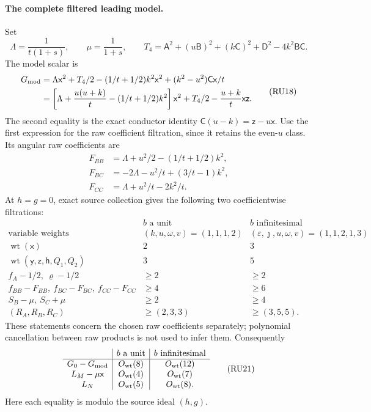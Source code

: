 \paragraph{The complete filtered leading model.}
Set
\[
 \Lambda=\frac1{t(1+s)},\qquad \mu=\frac1{1+s},\qquad
 T_4=\mathsf A^2+(u\mathsf B)^2+(k\mathsf C)^2+
                \mathsf D^2-4k^2\mathsf B\mathsf C.
\]
The model scalar is
\[
\begin{aligned}
 G_{\rm mod}
 &=\Lambda\mathsf x^2+T_4/2-(1/t+1/2)k^2\mathsf x^2
                      +(k^2-u^2)\mathsf C\mathsf x/t\\
 &=\left[\Lambda+\frac{u(u+k)}t-(1/t+1/2)k^2\right]\mathsf x^2
                  +T_4/2-\frac{u+k}t\mathsf x\mathsf z.
\end{aligned}                                                     \tag{RU18}
\]
The second equality is the exact conductor identity
$\mathsf C(u-k)=\mathsf z-u\mathsf x$. Use the first expression
for the raw coefficient filtration, since it retains the even-$u$
class. Its angular raw coefficients are
\[
\begin{aligned}
 F_{BB}&=\Lambda+u^2/2-(1/t+1/2)k^2,\\
 F_{BC}&=-2\Lambda-u^2/t+(3/t-1)k^2,\\
 F_{CC}&=\Lambda+u^2/t-2k^2/t.
\end{aligned}                                                     \tag{RU19}
\]
At $h=g=0$, exact source collection gives the following two
coefficientwise filtrations:
\[
\begin{array}{c|c|c}
 &b\text{ a unit}&b\text{ infinitesimal}\\ \hline
 \text{variable weights}&(k,u,\omega,v)=(1,1,1,2)
     &(\varepsilon,\jmath,u,\omega,v)=(1,1,2,1,3)\\
 \operatorname{wt}(\mathsf x)&2&3\\
 \operatorname{wt}(\mathsf y,\mathsf z,\mathsf h,Q_1,Q_2)&3&5\\
 f_A-1/2,\ \varrho-1/2&\ge2&\ge2\\
 f_{BB}-F_{BB},\ f_{BC}-F_{BC},\ f_{CC}-F_{CC}&\ge4&\ge6\\
 S_B-\mu,\ S_C+\mu&\ge2&\ge4\\
 (R_A,R_B,R_C)&\ge(2,3,3)&\ge(3,5,5).
\end{array}                                                       \tag{RU20}
\]
These statements concern the chosen raw coefficients separately;
polynomial cancellation between raw products is not used to infer
them. Consequently
\[
\begin{array}{c|c|c}
 &b\text{ a unit}&b\text{ infinitesimal}\\ \hline
 G_0-G_{\rm mod}&O_{\rm wt}(8)&O_{\rm wt}(12)\\
 L_M-\mu\mathsf x&O_{\rm wt}(4)&O_{\rm wt}(7)\\
 L_N&O_{\rm wt}(5)&O_{\rm wt}(8).
\end{array}                                                       \tag{RU21}
\]
Here each equality is modulo the source ideal $(h,g)$.

